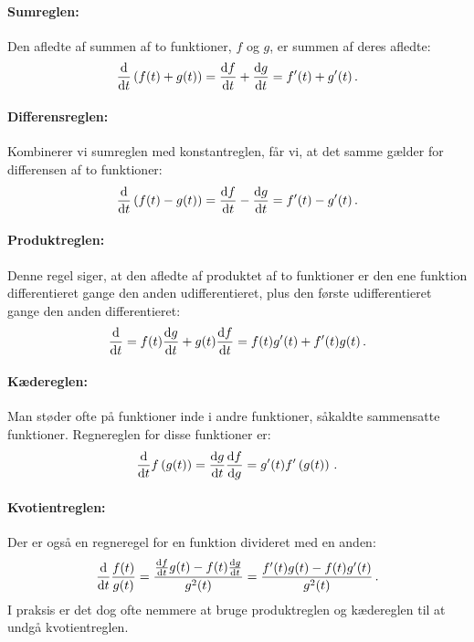 \paragraph*{Sumreglen:} Den afledte af summen af to funktioner, $f$ og $g$, er summen af deres afledte:
\begin{equation}
    \dv{}{t}\left(f(t)+g(t)\right)=\dv{f}{t}+\dv{g}{t}=f'(t)+g'(t) \, .
\end{equation}
\paragraph*{Differensreglen:} Kombinerer vi sumreglen med konstantreglen, får vi, at det samme gælder for differensen af to funktioner:
\begin{equation}
    \dv{}{t}\left(f(t)-g(t)\right)=\dv{f}{t}-\dv{g}{t}=f'(t)-g'(t) \, .
\end{equation}
\paragraph*{Produktreglen:} Denne regel siger, at den afledte af produktet af to funktioner er den ene funktion differentieret gange den anden udifferentieret, plus den første udifferentieret gange den anden differentieret: 
\begin{equation}
    \dv{}{t} (f(t)\cdot g(t))=f(t)\dv{g}{t}+g(t)\dv{f}{t}=f(t)g'(t)+f'(t)g(t) \, .
\end{equation}
\paragraph*{Kædereglen:} Man støder ofte på funktioner inde i andre funktioner, såkaldte sammensatte funktioner. Regnereglen for disse funktioner er:
\begin{equation}
    \dv{}{t} f\left(g(t)\right)=\dv{g}{t}\dv{f}{g}=g'(t)f'\left(g(t)\right) \, .
\end{equation}
\paragraph*{Kvotientreglen:} Der er også en regneregel for en funktion divideret med en anden:
\begin{equation}
    \dv{}{t} \frac{f(t)}{g(t)} = \frac{\dv{f}{t}g(t)-f(t)\dv{g}{t}}{g^2(t)}=\frac{f'(t)g(t)-f(t)g'(t)}{g^2(t)} \, .
\end{equation}
I praksis er det dog ofte nemmere at bruge produktreglen og kædereglen til at undgå kvotientreglen.

